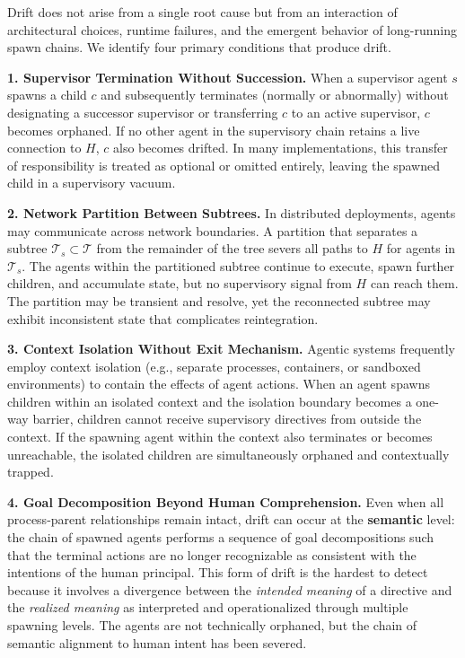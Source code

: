 Drift does not arise from a single root cause but from an interaction of architectural choices, runtime failures, and the emergent behavior of long-running spawn chains. We identify four primary conditions that produce drift.

\textbf{1. Supervisor Termination Without Succession.} When a supervisor agent $s$ spawns a child $c$ and subsequently terminates (normally or abnormally) without designating a successor supervisor or transferring $c$ to an active supervisor, $c$ becomes orphaned. If no other agent in the supervisory chain retains a live connection to $H$, $c$ also becomes drifted. In many implementations, this transfer of responsibility is treated as optional or omitted entirely, leaving the spawned child in a supervisory vacuum.

\textbf{2. Network Partition Between Subtrees.} In distributed deployments, agents may communicate across network boundaries. A partition that separates a subtree $\mathcal{T}_s \subset \mathcal{T}$ from the remainder of the tree severs all paths to $H$ for agents in $\mathcal{T}_s$. The agents within the partitioned subtree continue to execute, spawn further children, and accumulate state, but no supervisory signal from $H$ can reach them. The partition may be transient and resolve, yet the reconnected subtree may exhibit inconsistent state that complicates reintegration.

\textbf{3. Context Isolation Without Exit Mechanism.} Agentic systems frequently employ context isolation (e.g., separate processes, containers, or sandboxed environments) to contain the effects of agent actions. When an agent spawns children within an isolated context and the isolation boundary becomes a one-way barrier, children cannot receive supervisory directives from outside the context. If the spawning agent within the context also terminates or becomes unreachable, the isolated children are simultaneously orphaned and contextually trapped.

\textbf{4. Goal Decomposition Beyond Human Comprehension.} Even when all process-parent relationships remain intact, drift can occur at the \textbf{semantic} level: the chain of spawned agents performs a sequence of goal decompositions such that the terminal actions are no longer recognizable as consistent with the intentions of the human principal. This form of drift is the hardest to detect because it involves a divergence between the \textit{intended meaning} of a directive and the \textit{realized meaning} as interpreted and operationalized through multiple spawning levels. The agents are not technically orphaned, but the chain of semantic alignment to human intent has been severed.

